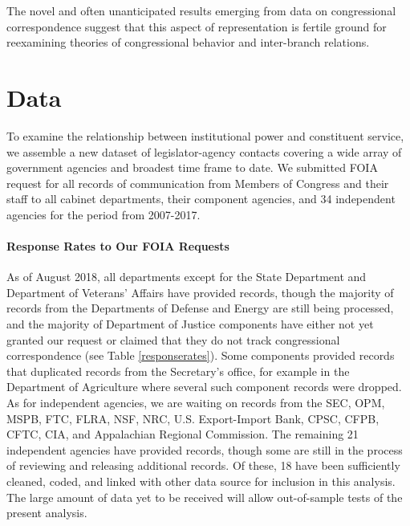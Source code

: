\documentclass{article}
\begin{document}
The novel and often unanticipated results emerging from data on congressional correspondence suggest that this aspect of representation is fertile ground for reexamining theories of congressional behavior and inter-branch relations. 




\section{Data} 
To examine the relationship between institutional power and constituent service, we assemble a new dataset of legislator-agency contacts covering a wide array of government agencies and broadest time frame to date. We submitted FOIA request for all records of communication from Members of Congress and their staff to all cabinet departments, their component agencies, and 34 independent agencies for the period from 2007-2017.

\paragraph{Response Rates to Our FOIA Requests} As of August 2018, all departments except for the State Department and Department of Veterans' Affairs have provided records, though the majority of records from the Departments of Defense and Energy are still being processed, and the majority of Department of Justice components have either not yet granted our request or claimed that they do not track congressional correspondence (see Table \ref{responserates}). Some components provided records that duplicated records from the Secretary's office, for example in the Department of Agriculture where several such component records were dropped. As for independent agencies, we are waiting on records from the SEC, OPM, MSPB, FTC, FLRA, NSF, NRC, U.S. Export-Import Bank, CPSC, CFPB, CFTC, CIA, and Appalachian Regional Commission. The remaining 21 independent agencies have provided records, though some are still in the process of reviewing and releasing additional records. Of these, 18 have been sufficiently cleaned, coded, and linked with other data source for inclusion in this analysis. The large amount of data yet to be received will allow out-of-sample tests of the present analysis. 
\end{document}
